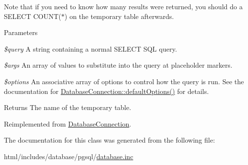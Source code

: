 Note that if you need to know how many results were returned, you should do a SELECT COUNT($\ast$) on the temporary table afterwards.


\begin{DoxyParams}{Parameters}
\item[{\em \$query}]A string containing a normal SELECT SQL query. \item[{\em \$args}]An array of values to substitute into the query at placeholder markers. \item[{\em \$options}]An associative array of options to control how the query is run. See the documentation for \hyperlink{classDatabaseConnection_a190539d6c494ef2d7ac90d21226de5a5}{DatabaseConnection::defaultOptions()} for details.\end{DoxyParams}
\begin{DoxyReturn}{Returns}
The name of the temporary table. 
\end{DoxyReturn}


Reimplemented from \hyperlink{classDatabaseConnection_ae4d9ad286187f493172da04fca77ca8f}{DatabaseConnection}.

The documentation for this class was generated from the following file:\begin{DoxyCompactItemize}
\item 
html/includes/database/pgsql/\hyperlink{pgsql_2database_8inc}{database.inc}\end{DoxyCompactItemize}
